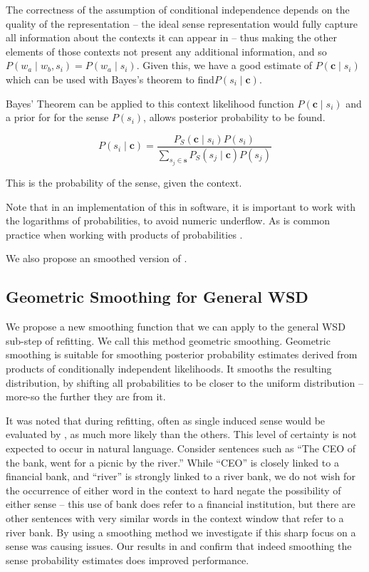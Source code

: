 \documentclass{sig-alternate}
\renewcommand{\c}{\mathbf{c}}
\newcommand{\s}{\mathbf{s}}
\begin{document}
The correctness of the assumption of conditional independence depends on the quality of the representation -- the ideal sense representation would fully capture all information about the contexts it can appear in -- thus making the other elements of those contexts not present any additional information, and so  $P(w_a \mid w_b,s_i)=P(w_a \mid s_i)$. Given this, we have a good estimate of $P(\c \mid s_{i})$ which can be used with Bayes's theorem to find$ P( s_i \mid \c)$.


Bayes' Theorem can be applied to this context likelihood function  $P(\c \mid s_{i})$ and a prior for for the sense $P(s_i)$, allows posterior probability to be found.

\begin{equation} \label{eq:generalwsd}
P(s_{i} \mid \c) = 
\dfrac{P_S(\c \mid s_{i})P(s_{i})}
{\sum_{s_{j}\in\s} P_S(s_{j} \mid \c)P(s_{j})}
\end{equation}

This is the probability of the sense, given the context.

Note that in an implementation of this in software, it is important to work with the logarithms of probabilities, to avoid numeric underflow. As is common practice when working with products of probabilities \parencite{press2007numerical}. 

We also propose an smoothed version of .

\subsection{Geometric Smoothing for General WSD} \label{smoothing}
We propose a new smoothing function that we can apply to the general WSD sub-step of refitting.
We call this method geometric smoothing. 
Geometric smoothing is suitable for smoothing posterior probability estimates derived from products of conditionally independent likelihoods.
It smooths the resulting distribution, by shifting all probabilities to be closer to the uniform distribution -- more-so the further they are from it.

It was noted that during refitting, often as single induced sense would be evaluated by , as much more likely than the others. This level of certainty is not expected to occur in natural language. Consider sentences such as \enquote{The CEO of the bank, went for a picnic by the river.} While \enquote{CEO} is closely linked to a financial bank, and \enquote{river} is strongly linked to a river bank, we do not wish for the occurrence of either word in the context to hard negate the possibility of either sense -- this use of bank does refer to a financial institution, but there are other sentences with very similar words in the context window that refer to a river bank.
By using a smoothing method we investigate if this sharp focus on a sense was causing issues.
Our results in  and  confirm that indeed smoothing the sense probability estimates does improved performance.
\end{document}
